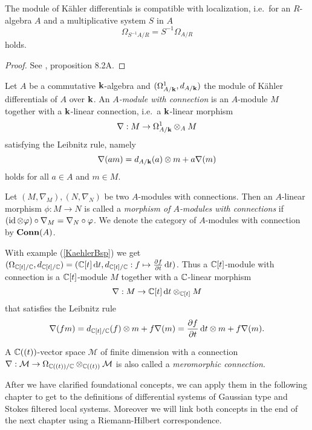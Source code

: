 \begin{lem}\label{kaehlerloca} The module of Kähler differentials is compatible with localization, i.e.\ for an $R$-algebra $A$ and a multiplicative system $S$ in $A$
\[
\Omega_{S^{-1}A/R} = S^{-1}\Omega_{A/R}
\]
holds.
\end{lem}
\begin{proof}
    See \cite{Hart}, proposition 8.2A.
\end{proof}

\begin{defi} Let $A$ be a commutative $\mathbf{k}$-algebra and $(\Omega_{A/\mathbf{k}}^1, d_{A/\mathbf{k}})$ the module of Kähler differentials of $A$ over $\mathbf{k}$. An \emph{$A$-module with connection} is an $A$-module $M$ together with a $\mathbf{k}$-linear connection, i.e.\ a $\mathbf{k}$-linear morphism 
\[
\nabla: M \to \Omega_{A/\mathbf{k}}^1 \otimes_A M   
\]
satisfying the Leibnitz rule, namely
\[\nabla(am) = d_{A/\mathbf{k}}(a) \otimes m + a \nabla(m)\]
holds for all $a \in A$ and $m \in M$. 

Let $(M,\nabla_M), (N,\nabla_N)$ be two $A$-modules with connections. Then an $A$-linear morphism $\phi: M \to N$ is called a \emph{morphism of $A$-modules with connections} if $(\operatorname{id} \otimes \varphi) \circ \nabla_M = \nabla_N \circ \varphi$. 
We denote the category of $A$-modules with connection by $\mathbf{Conn}(A)$.
\end{defi} 

\begin{ex}\label{C-con}
With example (\ref{KaehlerBsp}) we get $(\Omega_{\mathbb{C}[t]/\mathbb{C}}, d_{\mathbb{C}[t]/\mathbb{C}}) = (\mathbb{C}[t] \mathop{}\!\mathrm{d} t, d_{\mathbb{C}[t]/\mathbb{C}}: f \mapsto \frac{\partial f}{\partial t}\mathop{}\!\mathrm{d} t)$. Thus a $\mathbb{C}[t]$-module with connection is a $\mathbb{C}[t]$-module $M$ together with a $\mathbb{C}$-linear morphism
\[\nabla: M \to \mathbb{C}[t]\mathop{}\!\mathrm{d}{t} \otimes_{\mathbb{C}[t]} M\]
that satisfies the Leibnitz rule
\[\nabla(fm) = d_{\mathbb{C}[t]/\mathbb{C}}(f) \otimes m + f \nabla(m) = \frac{\partial f}{\partial t}\mathop{}\!\mathrm{d}{t} \otimes m + f \nabla(m).\]
\end{ex}

\begin{ex}
    A $\mathbb{C}((t))$-vector space $\mathcal{M}$ of finite dimension with a connection $\nabla: \mathcal{M} \to \Omega_{\mathbb{C}((t))/\mathbb{C}} \otimes_{\mathbb{C}((t))} \mathcal{M}$ is also called a \emph{meromorphic connection}.
\end{ex}


After we have clarified foundational concepts, we can apply them in the following chapter to get to the definitions of differential systems of Gaussian type and Stokes filtered local systems. Moreover we will link both concepts in the end of the next chapter using a Riemann-Hilbert correspondence.